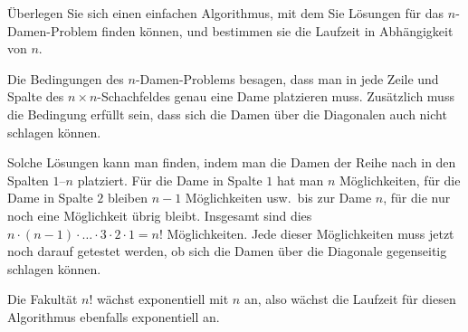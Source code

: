 Überlegen Sie sich einen einfachen Algorithmus, mit dem Sie Lösungen
für das $n$-Damen-Problem finden können, und bestimmen sie die
Laufzeit in Abhängigkeit von $n$.

\begin{loesung}
Die Bedingungen des $n$-Damen-Problems besagen, dass man in jede Zeile
und Spalte des $n\times n$-Schachfeldes genau eine Dame platzieren muss.
Zusätzlich muss die Bedingung erfüllt sein, dass sich die Damen über die
Diagonalen auch nicht schlagen können.

Solche Lösungen kann man finden, indem man die Damen 
der Reihe nach in den Spalten $1$--$n$ platziert.
Für die Dame in Spalte $1$ hat man $n$ Möglichkeiten, für die Dame
in Spalte $2$ bleiben $n-1$ Möglichkeiten usw.~bis zur Dame $n$, für
die nur noch eine Möglichkeit übrig bleibt.
Insgesamt sind dies $n\cdot (n-1)\cdot\ldots\cdot 3\cdot 2\cdot 1=n!$
Möglichkeiten.
Jede dieser Möglichkeiten muss jetzt noch darauf getestet werden,
ob sich die Damen über die Diagonale gegenseitig schlagen können.

Die Fakultät $n!$ wächst exponentiell mit $n$ an, also wächst die
Laufzeit für diesen Algorithmus ebenfalls exponentiell an.
\end{loesung}
